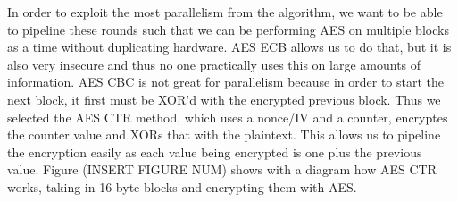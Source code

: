 In order to exploit the most parallelism from the algorithm, we want to be able to pipeline these rounds such that we can be performing AES on multiple blocks as a time without duplicating hardware. AES ECB allows us to do that, but it is also very insecure and thus no one practically uses this on large amounts of information. AES CBC is not great for parallelism because in order to start the next block, it first must be XOR'd with the encrypted previous block. Thus we selected the AES CTR method, which uses a nonce/IV and a counter, encryptes the counter value and XORs that with the plaintext. This allows us to pipeline the encryption easily as each value being encrypted is one plus the previous value. Figure (INSERT FIGURE NUM) shows with a diagram how AES CTR works, taking in 16-byte blocks and encrypting them with AES. 

